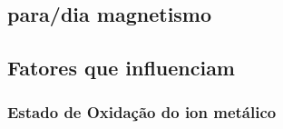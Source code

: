 \documentclass[12pt]{article}
\begin{document}
\subsection{para/dia magnetismo}

\subsection{Fatores que influenciam}

%	
%	

\subsubsection{Estado de Oxidação do ion metálico}
\end{document}
